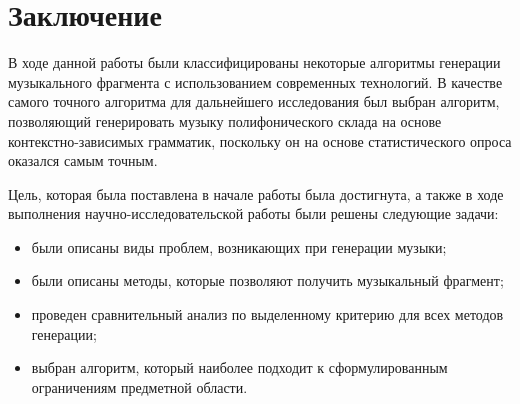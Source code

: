 \chapter*{Заключение}

В ходе данной работы были классифицированы некоторые алгоритмы генерации музыкального фрагмента с использованием современных технологий. В качестве самого точного алгоритма для дальнейшего исследования был выбран алгоритм, позволяющий генерировать музыку полифонического склада на основе контекстно-зависимых грамматик, поскольку он на основе статистического опроса оказался самым точным.

Цель, которая была поставлена в начале работы была достигнута, а также в ходе выполнения научно-исследовательской работы были решены следующие задачи:

\begin{itemize}
	\item были описаны виды проблем, возникающих при генерации музыки;
    \item были описаны методы, которые позволяют получить музыкальный фрагмент;
	\item проведен сравнительный анализ по выделенному критерию для всех методов генерации;
	\item выбран алгоритм, который наиболее подходит к сформулированным ограничениям предметной области.
\end{itemize}